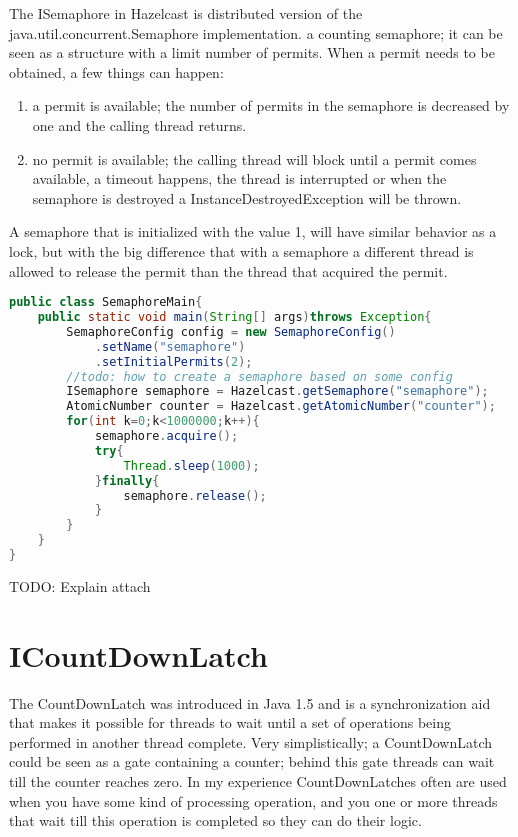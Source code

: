 The ISemaphore in Hazelcast is distributed version of the java.util.concurrent.Semaphore implementation. a counting semaphore; it can be seen as a structure with a limit number of permits. When a permit needs to be obtained, a few things can happen:
\begin{enumerate}
\item a permit is available; the number of permits in the semaphore is decreased by one and the calling thread returns.
\item no permit is available; the calling thread will block until a permit comes available, a timeout happens, the thread is interrupted or when the semaphore is destroyed a InstanceDestroyedException will be thrown.
\end{enumerate}

A semaphore that is initialized with the value 1, will have similar behavior as a lock, but with the big difference that with a semaphore a different thread is allowed to release the permit than the thread that acquired the permit.

\begin{lstlisting}[language=java]
public class SemaphoreMain{
    public static void main(String[] args)throws Exception{
        SemaphoreConfig config = new SemaphoreConfig()
            .setName("semaphore")
            .setInitialPermits(2);
        //todo: how to create a semaphore based on some config
        ISemaphore semaphore = Hazelcast.getSemaphore("semaphore");
        AtomicNumber counter = Hazelcast.getAtomicNumber("counter");
        for(int k=0;k<1000000;k++){
            semaphore.acquire();
            try{
                Thread.sleep(1000);
            }finally{
                semaphore.release();
            }
        }
    }
}
\end{lstlisting}

TODO: Explain attach

\section{ICountDownLatch}
The CountDownLatch was introduced in Java 1.5 and is a synchronization aid that makes it possible for threads to wait until a set of operations being performed in another thread  complete. Very simplistically; a CountDownLatch could be seen as a gate containing a counter; behind this gate threads can wait till the counter reaches zero. In my experience CountDownLatches often are used when you have some kind of processing operation, and you one or more threads that wait till this operation is completed so they can do their logic.

